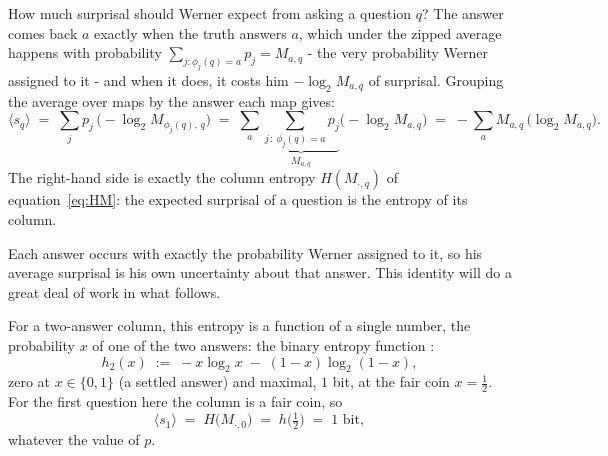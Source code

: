\documentclass[11pt]{article}
\begin{document}
How much surprisal should Werner expect from asking a question $q$?
The answer comes back $a$ exactly when the truth answers $a$, which
under the zipped average happens with probability
$\sum_{j:\phi_j(q)=a} p_j = M_{a,q}$ - the very probability Werner
assigned to it - and when it does, it costs him $-\log_2 M_{a,q}$
of surprisal. Grouping the average over maps by the answer each map
gives:
\begin{equation}\label{eq:surprisal-entropy}
  \langle s_q \rangle
  \;=\; \sum_{j} p_j \,\big({-}\log_2 M_{\phi_j(q),\,q}\big)
  \;=\; \sum_{a} \underbrace{\sum_{j\,:\,\phi_j(q)=a} p_j}_{M_{a,q}}
        \big({-}\log_2 M_{a,q}\big)
  \;=\; {-}\sum_{a} M_{a,q}\,\big(\log_2 M_{a,q}\big).
\end{equation}
The right-hand side is exactly the column entropy
$H(M_{\cdot,q})$ of equation~\eqref{eq:HM}: the expected
surprisal of a question is the entropy of its column. 

Each answer occurs with
exactly the probability Werner assigned to it, so his average
surprisal is his own uncertainty about that answer. This identity will do a great deal of work in what follows.

For a two-answer column, this entropy is a function of a single
number, the probability $x$ of one of the two answers: the
binary entropy function \cite{covthomas}:
\begin{equation}\label{eq:binary-entropy}
  h_2(x) \;:=\; -x\log_2 x \;-\; (1-x)\log_2(1-x),
\end{equation}
zero at $x \in \{0, 1\}$ (a settled answer) and maximal, $1$ bit, at
the fair coin $x = \tfrac12$. For the first question here the column
is a fair coin, so
\begin{equation}
  \langle s_1 \rangle \;=\; H\big(M_{\cdot,0}\big)
  \;=\; h\big(\tfrac12\big) \;=\; 1 \text{ bit},
\end{equation}
whatever the value of $p$.
\end{document}
